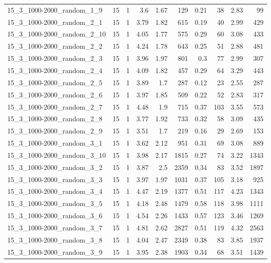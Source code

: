 \begin{center}
\begin{scriptsize}
\begin{longtable}{lrrrrrrrrr}
15\_3\_1000-2000\_random\_1\_9 & 15 & 1 & 3.6 & 1.67 & 129 & 0.21 & 38 & 2.83 & 99\\
15\_3\_1000-2000\_random\_2\_1 & 15 & 1 & 3.79 & 1.82 & 615 & 0.19 & 40 & 2.99 & 429\\
15\_3\_1000-2000\_random\_2\_10 & 15 & 1 & 4.05 & 1.77 & 575 & 0.29 & 60 & 3.08 & 433\\
15\_3\_1000-2000\_random\_2\_2 & 15 & 1 & 4.24 & 1.78 & 643 & 0.25 & 51 & 2.88 & 481\\
15\_3\_1000-2000\_random\_2\_3 & 15 & 1 & 3.96 & 1.97 & 801 & 0.3 & 77 & 2.99 & 307\\
15\_3\_1000-2000\_random\_2\_4 & 15 & 1 & 4.09 & 1.82 & 457 & 0.29 & 64 & 3.29 & 443\\
15\_3\_1000-2000\_random\_2\_5 & 15 & 1 & 3.89 & 1.7 & 287 & 0.12 & 23 & 2.55 & 287\\
15\_3\_1000-2000\_random\_2\_6 & 15 & 1 & 3.97 & 1.85 & 509 & 0.22 & 52 & 2.83 & 317\\
15\_3\_1000-2000\_random\_2\_7 & 15 & 1 & 4.48 & 1.9 & 715 & 0.37 & 103 & 3.55 & 573\\
15\_3\_1000-2000\_random\_2\_8 & 15 & 1 & 3.77 & 1.92 & 733 & 0.32 & 58 & 3.09 & 435\\
15\_3\_1000-2000\_random\_2\_9 & 15 & 1 & 3.51 & 1.7 & 219 & 0.16 & 29 & 2.69 & 153\\
15\_3\_1000-2000\_random\_3\_1 & 15 & 1 & 3.62 & 2.12 & 951 & 0.31 & 69 & 3.08 & 889\\
15\_3\_1000-2000\_random\_3\_10 & 15 & 1 & 3.98 & 2.17 & 1815 & 0.27 & 74 & 3.22 & 1343\\
15\_3\_1000-2000\_random\_3\_2 & 15 & 1 & 3.87 & 2.5 & 2359 & 0.34 & 83 & 3.52 & 1897\\
15\_3\_1000-2000\_random\_3\_3 & 15 & 1 & 3.97 & 1.97 & 1031 & 0.37 & 105 & 3.18 & 925\\
15\_3\_1000-2000\_random\_3\_4 & 15 & 1 & 4.47 & 2.19 & 1377 & 0.51 & 117 & 4.23 & 1343\\
15\_3\_1000-2000\_random\_3\_5 & 15 & 1 & 4.18 & 2.48 & 1479 & 0.58 & 118 & 3.98 & 1111\\
15\_3\_1000-2000\_random\_3\_6 & 15 & 1 & 4.54 & 2.26 & 1433 & 0.57 & 123 & 3.46 & 1269\\
15\_3\_1000-2000\_random\_3\_7 & 15 & 1 & 4.81 & 2.62 & 2827 & 0.51 & 119 & 4.32 & 2563\\
15\_3\_1000-2000\_random\_3\_8 & 15 & 1 & 4.04 & 2.47 & 2349 & 0.38 & 83 & 3.85 & 1937\\
15\_3\_1000-2000\_random\_3\_9 & 15 & 1 & 3.95 & 2.38 & 1903 & 0.34 & 68 & 3.51 & 1439\\

\end{longtable}
\end{scriptsize}
\end{center}
